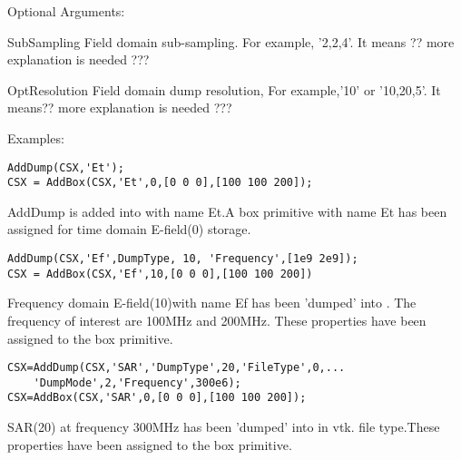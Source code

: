 \begin{FontDescr}{Optional Arguments:}
\begin{FontPara}{SubSampling}
Field domain sub-sampling. For example, '2,2,4'. It means ?? more explanation is needed  ???
\end{FontPara}

\begin{FontPara}{OptResolution}
Field domain dump resolution, For example,'10' or '10,20,5'. It means?? more explanation is needed  ???
\end{FontPara}

\end{FontDescr}

\begin{FontDescr}{Examples:}
\begin{lstlisting} 
AddDump(CSX,'Et');
CSX = AddBox(CSX,'Et',0,[0 0 0],[100 100 200]); 
\end{lstlisting}

AddDump is added into \hyperref[CSX]{} with name Et.A box primitive with name Et has been assigned for time domain E-field(0) storage.   

\begin{lstlisting} 
AddDump(CSX,'Ef',DumpType, 10, 'Frequency',[1e9 2e9]);
CSX = AddBox(CSX,'Ef',10,[0 0 0],[100 100 200])
\end{lstlisting}

Frequency domain E-field(10)with name Ef has been 'dumped' into \hyperref[CSX]{}. The frequency of interest are 100MHz and 200MHz. These properties have been assigned to the box primitive.      

\begin{lstlisting} 
CSX=AddDump(CSX,'SAR','DumpType',20,'FileType',0,...
    'DumpMode',2,'Frequency',300e6);
CSX=AddBox(CSX,'SAR',0,[0 0 0],[100 100 200]);
\end{lstlisting}

SAR(20) at frequency 300MHz has been 'dumped' into \hyperref[CSX]{} in vtk. file type.These properties have been assigned to the box primitive.          

\end{FontDescr}


